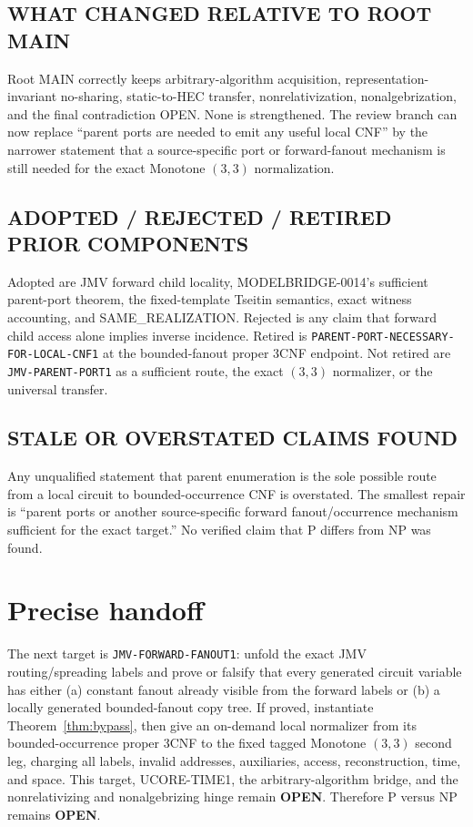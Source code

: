 \documentclass[11pt]{article}
\newcommand{\OPEN}{\textbf{OPEN}}
\begin{document}
\subsection*{WHAT CHANGED RELATIVE TO ROOT MAIN}
Root MAIN correctly keeps arbitrary-algorithm acquisition,
representation-invariant no-sharing, static-to-HEC transfer,
nonrelativization, nonalgebrization, and the final contradiction OPEN.
None is strengthened.  The review branch can now replace ``parent ports
are needed to emit any useful local CNF'' by the narrower statement that a
source-specific port or forward-fanout mechanism is still needed for the
exact Monotone $(3,3)$ normalization.

\subsection*{ADOPTED / REJECTED / RETIRED PRIOR COMPONENTS}
Adopted are JMV forward child locality, MODELBRIDGE-0014's sufficient
parent-port theorem, the fixed-template Tseitin semantics, exact witness
accounting, and SAME\_REALIZATION.  Rejected is any claim that forward
child access alone implies inverse incidence.  Retired is
\texttt{PARENT-PORT-NECESSARY-FOR-LOCAL-CNF1} at the bounded-fanout proper
3CNF endpoint.  Not retired are \texttt{JMV-PARENT-PORT1} as a sufficient
route, the exact $(3,3)$ normalizer, or the universal transfer.

\subsection*{STALE OR OVERSTATED CLAIMS FOUND}
Any unqualified statement that parent enumeration is the sole possible
route from a local circuit to bounded-occurrence CNF is overstated.  The
smallest repair is ``parent ports or another source-specific forward
fanout/occurrence mechanism sufficient for the exact target.''  No
verified claim that P differs from NP was found.

\section{Precise handoff}

The next target is \texttt{JMV-FORWARD-FANOUT1}: unfold the exact JMV
routing/spreading labels and prove or falsify that every generated circuit
variable has either (a) constant fanout already visible from the forward
labels or (b) a locally generated bounded-fanout copy tree.  If proved,
instantiate Theorem~\ref{thm:bypass}, then give an on-demand local
normalizer from its bounded-occurrence proper 3CNF to the fixed tagged
Monotone $(3,3)$ second leg, charging all labels, invalid addresses,
auxiliaries, access, reconstruction, time, and space.  This target,
UCORE-TIME1, the arbitrary-algorithm bridge, and the nonrelativizing and
nonalgebrizing hinge remain \OPEN.  Therefore P versus NP remains \OPEN.
\end{document}
